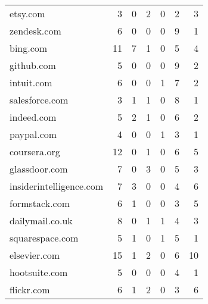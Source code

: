 \begin{table}[t]
\begin{tabularx}{0.85\columnwidth}{p{}rrr|rrr}
\small etsy.com          & 3                       & 0                       & 2                       & 0                       & 2                       & 3                        \\
\small zendesk.com       & 6                       & 0                       & 0                       & 0                       & 9                       & 1                        \\
\small bing.com          & 11                      & 7                       & 1                       & 0                       & 5                       & 4                        \\
\small github.com        & 5                       & 0                       & 0                       & 0                       & 9                       & 2                        \\
\small intuit.com        & 6                       & 0                       & 0                       & 1                       & 7                       & 2                        \\
\small salesforce.com    & 3                       & 1                       & 1                       & 0                       & 8                       & 1                        \\
\small indeed.com        & 5                       & 2                       & 1                       & 0                       & 6                       & 2                        \\
\small paypal.com        & 4                       & 0                       & 0                       & 1                       & 3                       & 1                        \\
\small coursera.org			& 12	& 0		& 1		& 0		& 6		& 5 \\
\small glassdoor.com			& 7		& 0		& 3		& 0		& 5		& 3 \\
\small insiderintelligence.com	& 7		& 3		& 0		& 0		& 4		& 6 \\
\small formstack.com			& 6		& 1		& 0		& 0		& 3		& 5 \\
\small dailymail.co.uk			& 8		& 0		& 1		& 1		& 4		& 3 \\
\small squarespace.com			& 5		& 1		& 0		& 1		& 5		& 1 \\
\small elsevier.com			& 15	& 1		& 2		& 0		& 6		& 10 \\
\small hootsuite.com			& 5		& 0		& 0		& 0		& 4		& 1 \\
\small flickr.com				& 6		& 1		& 2		& 0		& 3		& 6 \\

\end{tabularx}
\end{table}
